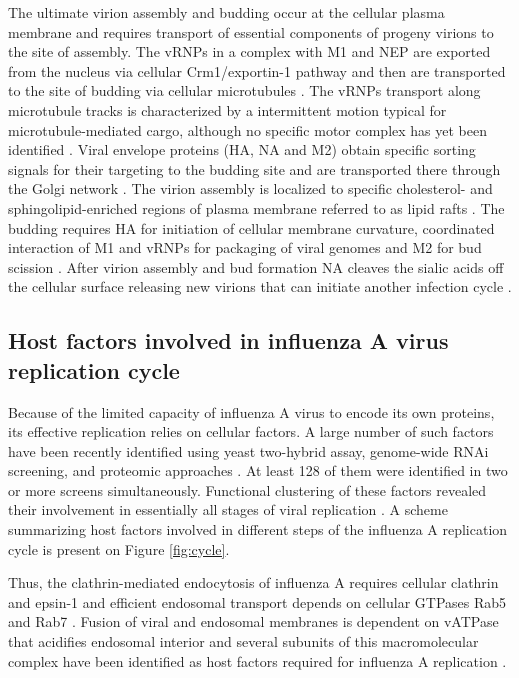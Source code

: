 	The ultimate virion assembly and budding occur at the cellular plasma membrane and requires transport of essential components of progeny virions to the site of assembly. The \gls{vRNP}s in a complex with \gls{M1} and \gls{NEP} are exported from the nucleus via cellular Crm1/exportin-1 pathway and then are transported to the site of budding via cellular microtubules  \parencite{Akarsu2003, Momose2007, Kawaguchi2012}. The \glspl{vRNP} transport along microtubule tracks is characterized by a intermittent motion typical for microtubule-mediated cargo, although no specific motor complex has yet been identified \parencite{Amorim2011, Momose2011, Avilov2012}.	Viral envelope proteins (\gls{HA}, \gls{NA} and \gls{M2}) obtain specific sorting signals for their targeting to the budding site \parencite{Hughey1992, Kundu1996, Tall2003} and are transported there through the Golgi network \parencite{Daniels-Holgate1989}. The virion assembly is localized to specific  cholesterol- and sphingolipid-enriched regions of plasma membrane referred to as lipid rafts \parencite{Scheiffele1999}. The budding requires \gls{HA} for initiation of cellular membrane curvature, coordinated interaction of \gls{M1} and \gls{vRNP}s for packaging of viral genomes and \gls{M2} for bud scission \parencite{Nayak2009, Rossman2011}. After virion assembly and bud formation \gls{NA} cleaves the sialic acids off the cellular surface releasing new virions that can initiate another infection cycle \parencite{Barman2004}.

	
	\subsection{Host factors involved in influenza A virus replication cycle}
	
	Because of the limited capacity of influenza A virus to encode its own proteins, its effective replication relies on cellular factors. A large number of such factors have been recently identified using yeast two-hybrid assay, genome-wide RNAi screening, and proteomic approaches \parencite{Mayer2007, Brass2009, Shapira2009, Hao2008, Karlas2010, Konig2010, Shaw2011, Song2011}. At least 128 of them were identified in two or more screens simultaneously. Functional clustering of these factors revealed their involvement in essentially all stages of viral replication \parencite{Watanabe2010}. A scheme summarizing host factors involved in different steps of the influenza A replication cycle is present on Figure \ref{fig:cycle}.
	
	Thus, the clathrin-mediated endocytosis of influenza A requires cellular clathrin and epsin-1 \parencite{Chen2008a} and efficient endosomal transport depends on cellular GTPases Rab5 and Rab7 \parencite{Sieczkarski2003}. Fusion of viral and endosomal membranes is dependent on \gls{vATPase} that acidifies endosomal interior and several subunits of this macromolecular complex have been identified as host factors required for influenza A replication \parencite{Watanabe2010}. 
	
